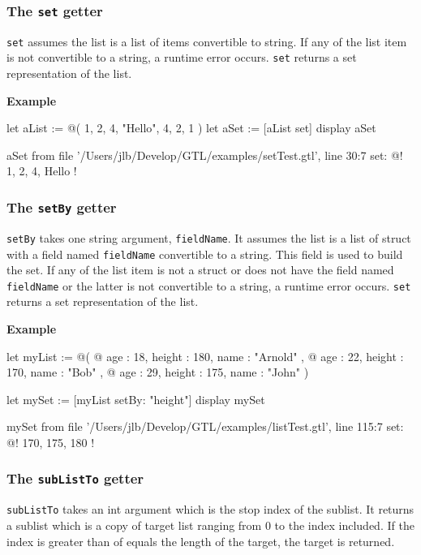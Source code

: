 \documentclass[10pt,openright,twosides,final]{memoir}
\newcommand{\gtlarg}[1]{{\footnotesize\ttfamily\colorbox{light-blue}{#1}}}
\newcommand{\gtlinline}[1]{\colorbox{light-blue}{\lstinline[language=gtl]{#1}}}
\newcommand{\example}{\vspace{.75em}\noindent\textbf{Example}\vspace{0em}}
\begin{document}
\subsubsection{The \texttt{set} getter}

\gtlinline{set} assumes the list is a list of items convertible to string. If any of the list item is not convertible to a string, a runtime error occurs. \gtlinline{set} returns a set representation of the list.

\example
\begin{gtl}
let aList := @( 1, 2, 4, "Hello", 4, 2, 1 )
let aSet := [aList set]
display aSet
\end{gtl}
\begin{console}
aSet from file '/Users/jlb/Develop/GTL/examples/setTest.gtl', line 30:7
    set: @!
        1, 2, 4, Hello
    !
\end{console}

\subsubsection{The \texttt{setBy} getter}

\gtlinline{setBy} takes one string argument, \gtlinline{fieldName}. It assumes the list is a list of struct with a field named \gtlinline{fieldName} convertible to a string. This field is used to build the set. If any of the list item is not a struct or does not have the field named \gtlinline{fieldName} or the latter is not convertible to a string, a runtime error occurs. \gtlinline{set} returns a set representation of the list.

\example
\begin{gtl}
let myList := @(
  @{ age : 18, height : 180, name : "Arnold" },
  @{ age : 22, height : 170, name : "Bob"    },
  @{ age : 29, height : 175, name : "John"   }
)

let mySet := [myList setBy: "height"]
display mySet
\end{gtl}
\begin{console}
mySet from file '/Users/jlb/Develop/GTL/examples/listTest.gtl', line 115:7
    set: @!
        170, 175, 180
    !
\end{console}

\subsubsection{The \texttt{subListTo} getter}

\gtlinline{subListTo} takes an int argument which is the stop \gtlarg{index} of the sublist. It returns a sublist which is a copy of target list ranging from 0 to the \gtlarg{index} included. If the \gtlarg{index} is greater than of equals the length of the target, the target is returned.
\end{document}
